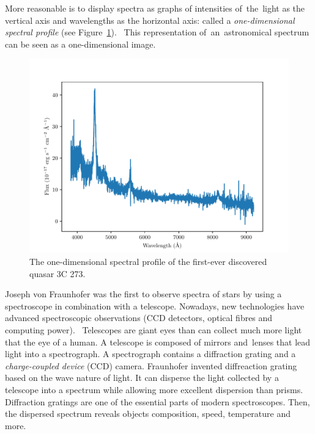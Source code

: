 More reasonable is to display spectra as graphs of intensities of~the~light as the vertical axis and wavelengths as the horizontal axis:
called a \textit{one-dimensional spectral profile}
(see Figure~\ref{3c_273_spectrum}).~\cite{cochard2018, bennett2005}
This representation of~an~astronomical spectrum can be seen as a one-dimensional image.

\begin{figure}
\includegraphics[width=\textwidth]{img/spec_3c_273.pdf}
\caption[One-dimensional spectrum of the quasar 3C 273]{
	The one-dimensional spectral profile of the first-ever discovered quasar 3C 273.
}
\label{3c_273_spectrum}
\end{figure}


Joseph von Fraunhofer was the first to observe spectra of stars by using a spectroscope in combination with a telescope.
Nowadays, new technologies have advanced spectroscopic observations
(CCD detectors, optical fibres and computing power).~\cite{cochard2018}
Telescopes are giant eyes than can collect much more light that the eye of a human.
A telescope is composed of mirrors and~lenses that lead light into a spectrograph.
A spectrograph contains a diffraction grating and a \textit{charge-coupled device} (CCD) camera.
Fraunhofer invented diffreaction grating based on the wave nature of light.
It can disperse the light collected by a telescope into a spectrum
while allowing more excellent dispersion than prisms.
Diffraction gratings are one of the essential parts of modern spectroscopes.
Then, the dispersed spectrum reveals objects composition, speed, temperature
and more.~\cite{bennett2005}

